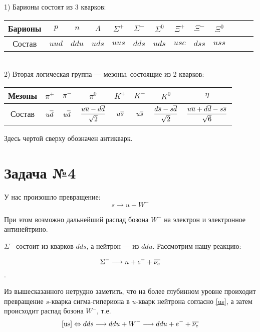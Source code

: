 \documentclass[12pt]{article}
\newcommand{\ov}{\ensuremath{\overline}}
\newcommand{\st}{\ensuremath{\longrightarrow}}
\begin{document}
1) Барионы состоят из 3 кварков: 

\begin{tabular}{|c|c|c|c|c|c|c|c|c|c|c|c|c|}
	\hline 
	Барионы&$  p $ & $ n $ &$  \Lambda $ & $ \Sigma^+ $ &$  \Sigma^- $ & $ \Sigma^0 $ & $ \Xi^+ $ & $ \Xi^- $ & $ \Xi^0 $    \\ 
	\hline 
	Состав & $ uud $ & $ ddu $ & $ uds $ & $ uus $ & $ dds $ & $ uds $ & $ usc $ & $ dss $ & $ uss $   \\ 
	\hline 
\end{tabular} 
\\

2) Вторая логическая группа --- мезоны, состоящие из 2 кварков: 
\par
\vspace{0.1cm}
\begin{tabular}{|c|c|c|c|c|c|c|c|}
	\hline 
	Мезоны &$  \pi^+ $ & $ \pi^-  $& $ \pi^0 $ &$  K^+ $ & $ K^-  $& $ K^0 $ & $ \eta $ \\ 
	\hline 
	Состав &$  u\ov{d} $ & $ u\ov{d} $ & $ \dfrac{u\ov{u} - d\ov{d}}{\sqrt{2}} $ & $ u\ov{s} $ & $ u\ov{s}  $& $ \dfrac{d\ov{s} - s\ov{d}}{\sqrt{2}}  $ &  $ \dfrac{u\ov{u} + d\ov{d} - s\ov{s}}{\sqrt{6}} $  \\ 
	\hline 
\end{tabular} 

Здесь чертой сверху обозначен антикварк.

\section{Задача №4}

У нас произошло превращение: 
\begin{equation}
s \st u + W^-
\label{us}
\end{equation}

При этом возможно дальнейший распад бозона $ W^- $ на электрон и электронное антинейтрино. 

$ \Sigma^- $ состоит из кварков $  dds $, а нейтрон --- из $ ddu $.  Рассмотрим нашу реакцию: 

$$ \Sigma^- \st n + e^- + \ov{\nu_e} $$. 

Из вышесказанного нетрудно заметить, что на более глубинном уровне проиходит превращение $ s$-кварка сигма-гипериона в $ u $-кварк нейтрона согласно \eqref{us}, а затем происходит распад бозона $ W^- $, т.е. 
\begin{equation}
\eqref{us} \Leftrightarrow dds \st ddu + W^- \st ddu + e^- + \ov{\nu_e}
\end{equation}
\end{document}
